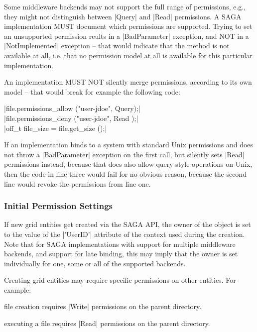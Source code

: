   Some middleware backends may not support the full range of
  permissions, e.g., they might not distinguish between |Query| and
  |Read| permissions.  A SAGA implementation MUST document which
  permissions are supported.  Trying to set an unsupported
  permission reults in a |BadParameter| exception, and NOT in
  a |NotImplemented| exception -- that would indicate that the
  method is not available at all, i.e. that no permission model at all
  is available for this particular implementation.
 
  \newpage
 
  An implementation MUST NOT silently merge permissions,
  according to its own model -- that would break for example the
  following code:
 
  \shift |file.permissions_allow ("user-jdoe", Query);|\\
  \shift |file.permissions_deny  ("user-jdoe", Read );|\\
  \shift |off_t file_size = file.get_size ();|
 
  If an implementation binds to a system with standard Unix
  permissions and does not throw a |BadParameter| exception on
  the first call, but silently sets |Read| permissions instead,
  because that does also allow query style operations on Unix,
  then the code in line three would fail for no obvious reason,
  because the second line would revoke the permissions from line
  one.
 
 
 \subsubsection*{Initial Permission Settings}
 
  If new grid entities get created via the SAGA API, the owner
  of the object is set to the value of the |'UserID'| attribute
  of the context used during the creation.  Note that for SAGA
  implementations with support for multiple middleware backends,
  and support for late binding, this may imply that the owner is
  set individually for one, some or all of the supported
  backends.
 
  Creating grid entities may require specific permissions on
  other entities.  For example:
 
  \begin{shortlist}
   \item file creation requires |Write| permissions on the 
         parent directory.
   \item executing a file requires |Read| permissions on the
         parent directory.
  \end{shortlist}
 
